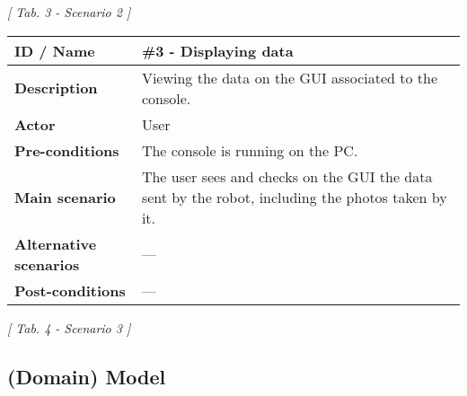 \documentclass[a4paper]{article}
\begin{document}
\begin{center}
	\textit{[ Tab. 3 - Scenario 2 ]}
\end{center}

\hfill \break

\def\arraystretch{1.8}
\begin{tabular}{ | m{4cm} | m{11cm}| }
	
	\hline
	
	\textbf{ID / Name}&\textbf{\#3 - Displaying data}\\ 
	
	\hline
	
	\textbf{Description}&Viewing the data on the GUI associated to the console.\\

	\hline
	
	\textbf{Actor}&User\\
	
	\hline	

	\textbf{Pre-conditions}&The console is running on the PC.\\

	\hline

	\textbf{Main scenario}&The user sees and checks on the GUI the data sent by the robot, including the photos taken by it.\\
	
	\hline	
	
	\textbf{Alternative scenarios}&---\\
	
	\hline
	
	\textbf{Post-conditions}&---\\
	
	\hline
	
\end{tabular}

\begin{center}
	\textit{[ Tab. 4 - Scenario 3 ]}
\end{center}

\hfill \break


\subsection {(Domain) Model}
\end{document}
